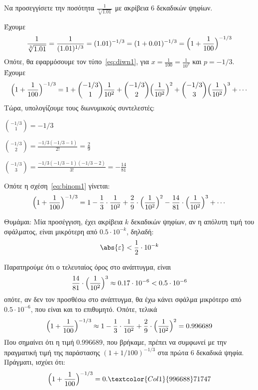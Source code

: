 \documentclass[a4paper,table]{report}
\begin{document}
\begin{mybox3}
\begin{example}
  Να προσεγγίσετε την ποσότητα $ \frac{1}{\sqrt[3]{1.01}} $ με ακρίβεια 6 δεκαδικών
  ψηφίων.
\end{example}
\end{mybox3}
\begin{solution}
  Έχουμε 
  \[
    \frac{1}{\sqrt[3]{1.01}} = \frac{1}{(1.01)^{1/3}} = (1.01)^{-1/3} = (1+0.01)^{-1/3} =
    \Bigl(1+ \frac{1}{100} \Bigr)^{-1/3}
  \] 
  Οπότε, θα εφαρμόσουμε τον τύπο~\eqref{eq:diwn1}, για $ x= \frac{1}{100} =
  \frac{1}{10^{2}} $ και $ p=-1/3 $. Έχουμε
  \begin{equation}\label{eq:binom1}
    \Bigl(1+ \frac{1}{100} \Bigr)^{-1/3} = 1 +  \binom{-1/3}{1} \frac{1}{10^{2}} +
    \binom{-1/3}{2} \Bigl(\frac{1}{10^{2}}\Bigr)^{2} + \binom{-1/3}{3}
    \Bigl(\frac{1}{10^{2}} \Bigr)^{3} + \cdots
  \end{equation} 
  Τώρα, υπολογίζουμε τους διωνυμικούς συντελεστές:
  \begin{myitemize}
    \item $ \binom{-1/3}{1} = -1/3 $
    \item $ \binom{-1/3}{2} = \frac{-1/3(-1/3 -1)}{2!} = \frac{2}{9} $
    \item $ \binom{-1/3}{3} = \frac{-1/3(-1/3 -1)(-1/3 - 2)}{3!} =-\frac{14}{81} $ 
  \end{myitemize}
  Οπότε η σχέση~\eqref{eq:binom1} γίνεται:
  \[
    \Bigl(1+ \frac{1}{100} \Bigr)^{-1/3} = 1 - \frac{1}{3} \cdot \frac{1}{10^{2}} +
    \frac{2}{9} \cdot \Bigl(\frac{1}{10^{2}}\Bigr)^{2} - \frac{14}{81} \cdot
    \Bigl(\frac{1}{10^{2}} \Bigr)^{3} + \cdots
  \]
  \begin{mybox1}
  \item {}
    \textcolor{Col1}{Θυμάμαι:} Μία προσέγγιση, έχει ακρίβεια $k$ δεκαδικών ψηφίων, αν 
    η απόλυτη τιμή του σφάλματος, είναι μικρότερη από $ 0.5 \cdot 10^{-k} $, δηλαδή:
    \[
      \abs{\varepsilon} < \frac{1}{2} \cdot 10^{-k} 
    \]
  \end{mybox1}
  Παρατηρούμε ότι ο τελευταίος όρος στο ανάπτυγμα, είναι 
  \[
    \frac{14}{81} \cdot \Bigl(\frac{1}{10^{2}} \Bigr)^{3} \approx 0.17 \cdot 10^{-6} < 0.5 \cdot
    10^{-6}
  \] 
  οπότε, αν δεν τον προσθέσω στο ανάπτυγμα, θα έχω κάνει σφάλμα μικρότερο από $ 0.5
  \cdot 10^{-6} $, που είναι και το επιθυμητό.
  Οπότε, τελικά
  \[
    \Bigl(1+ \frac{1}{100} \Bigr)^{-1/3} \approx 1 - \frac{1}{3} \cdot \frac{1}{10^{2}} +
    \frac{2}{9} \cdot \Bigl(\frac{1}{10^{2}}\Bigr)^{2} = 0.996689
  \]
  Που σημαίνει ότι η τιμή $ 0.996689 $, που βρήκαμε, πρέπει να συμφωνεί με την 
  πραγματική τιμή της παράστασης $(1+ 1/{100})^{-1/3} $ στα πρώτα 6 
  δεκαδικά ψηφία. Πράγματι, ισχύει ότι:
  \[
    \Bigl(1+ \frac{1}{100} \Bigr)^{-1/3} = 0.\textcolor{Col1}{996688}71747
  \] 
\end{solution}
\end{document}
